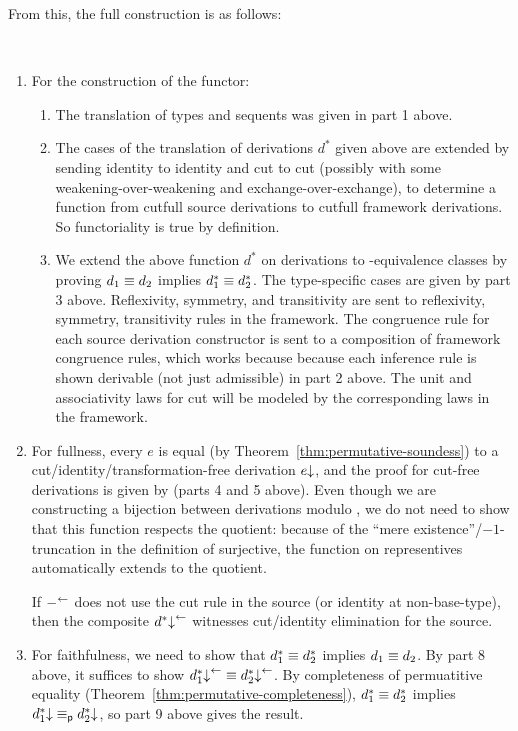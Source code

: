 From this, the full construction is as follows:
\begin{remark} ~
\begin{enumerate}
\item For the construction of the functor:
\begin{enumerate}
\item The translation of types and sequents was given in part 1 above.

\item The cases of the translation of derivations $d^*$ given above are
  extended by sending identity to identity and cut to cut (possibly with
  some weakening-over-weakening and exchange-over-exchange), to
  determine a function from cutfull source derivations to cutfull
  framework derivations.  So functoriality is true by definition.  

\item We extend the above function $d^*$ on derivations to
  \deq-equivalence classes by proving $d_1 \equiv d_2$ implies $d_1^* \equiv
  d_2^*$.  The type-specific cases are given by part 3 above.
  Reflexivity, symmetry, and transitivity are sent to reflexivity,
  symmetry, transitivity rules in the framework. The congruence rule for
  each source derivation constructor is sent to a composition of
  framework congruence rules, which works because because each inference
  rule is shown derivable (not just admissible) in part 2 above. The
  unit and associativity laws for cut will be modeled by the
  corresponding laws in the framework.  
\end{enumerate}

\item For fullness, every $e$ is equal (by
  Theorem~\ref{thm:permutative-soundess}) to a
  cut/identity/transformation-free derivation $e\mathord{\downarrow}$, and the proof
  for cut-free derivations is given by \backtrf{-} (parts 4 and 5
  above).  Even though we are constructing a bijection between
  derivations modulo \deq, we do not need to show that this function
  respects the quotient: because of the ``mere
  existence''/$-1$-truncation in the definition of surjective, the
  function on representives automatically extends to the quotient.

  If $-^{\leftarrow}$ does not use the cut rule in the source (or identity
  at non-base-type), then the composite $d^*\mathord{\downarrow}^{\leftarrow}$ 
  witnesses cut/identity elimination for the source.  

\item For faithfulness, we need to show that $d_1^* \equiv d_2^*$ implies
  $d_1 \equiv d_2$.  By part 8 above, it suffices to show 
  $d_1^*\mathord{\downarrow}^{\leftarrow} \equiv d_2^*\mathord{\downarrow}^{\leftarrow}$.
  By completeness of permuatitive equality
  (Theorem~\ref{thm:permutative-completeness}), 
  $d_1^* \equiv d_2^*$ implies $d_1^*\mathord{\downarrow} \equiv_{\mathsf{p}} d_2^*\mathord{\downarrow}$,
  so part 9 above gives the result.
\end{enumerate}
\end{remark}

